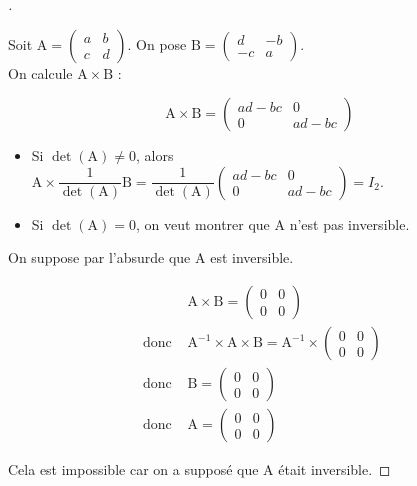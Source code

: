 \documentclass[12pt]{article}
\theoremstyle{break}
\newenvironment{demo}[1][\proofname]{%
  \begin{proof}[#1]$ $\newline
}{%
  \end{proof}
}
\begin{document}
\begin{demo}
Soit $\mathrm{A}=\left(\begin{array}{ll}a & b \\ c & d\end{array}\right)$. On pose $\mathrm{B}=\left(\begin{array}{cc}d & -b \\ -c & a\end{array}\right)$.\\
On calcule $\mathrm{A} \times \mathrm{B}$ :

$$
\mathrm{A} \times \mathrm{B}=\left(\begin{array}{cc}
a d-b c & 0 \\
0 & a d-b c
\end{array}\right)
$$

\begin{itemize}[noitemsep,topsep=0pt]
  \item Si $\operatorname{det}(\mathrm{A}) \neq 0$, alors $\mathrm{A} \times \dfrac{1}{\operatorname{det}(\mathrm{A})} \mathrm{B}=\dfrac{1}{\operatorname{det}(\mathrm{A})}\left(\begin{array}{cc}a d-b c & 0 \\ 0 & a d-b c\end{array}\right)=I_{2}$.
  \item Si $\operatorname{det}(\mathrm{A})=0$, on veut montrer que A n'est pas inversible.
\end{itemize}

On suppose par l'absurde que A est inversible.

$$
\begin{array}{ll} 
& \mathrm{A} \times \mathrm{B}=\left(\begin{array}{ll}
0 & 0 \\
0 & 0
\end{array}\right) \\
\text { donc } & \mathrm{A}^{-1} \times \mathrm{A} \times \mathrm{B}=\mathrm{A}^{-1} \times\left(\begin{array}{ll}
0 & 0 \\
0 & 0
\end{array}\right) \\
\text { donc } & \mathrm{B}=\left(\begin{array}{ll}
0 & 0 \\
0 & 0
\end{array}\right) \\
\text { donc } & \mathrm{A}=\left(\begin{array}{ll}
0 & 0 \\
0 & 0
\end{array}\right)
\end{array}
$$

Cela est impossible car on a supposé que A était inversible.
\end{demo}
\end{document}
